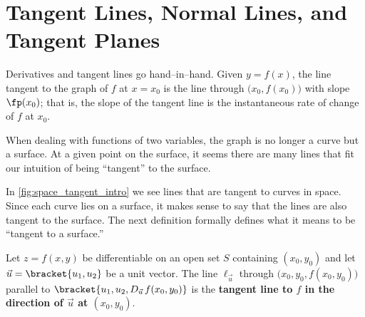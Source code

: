 \section{Tangent Lines, Normal Lines, and Tangent Planes}\label{sec:multi_tangent}

Derivatives and tangent lines go hand--in--hand. Given $y=f(x)$, the line tangent to the graph of $f$ at $x=x_0$ is the line through $\big(x_0,f(x_0)\big) $ with slope $\fp(x_0)$; that is, the slope of the tangent line is the instantaneous rate of change of $f$ at $x_0$. 

When dealing with functions of two variables, the graph is no longer a curve but a surface. At a given point on the surface, it seems there are many lines that fit our intuition of being ``tangent'' to the surface. 


In \autoref{fig:space_tangent_intro} we see lines that are tangent to curves in space. Since each curve lies on a  surface, it makes sense to say that the lines are also tangent to the surface. The next definition formally defines what it means to be ``tangent to a surface.'' %

{Let $z=f(x,y)$ be differentiable on an open set $S$ containing $(x_0,y_0)$ and let $\vec u =\bracket{u_1, u_2}$ be a unit vector.
%	
%	
The line $\ell_{\vec u}$ through $\big(x_0,y_0,f(x_0,y_0)\big)$ parallel to $\bracket{u_1,u_2,D_{\vec u\,}f(x_0,y_0)}$ is the \textbf{tangent line to $f$ in the direction of $\vec u$ at $(x_0,y_0)$}.
}

